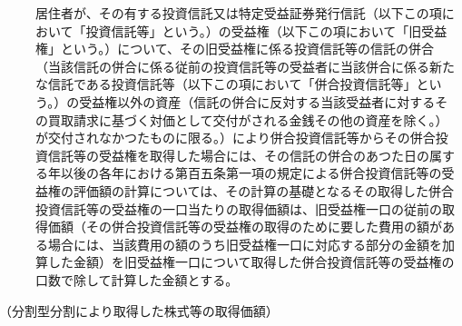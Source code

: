 \documentclass[twocolumn,a4j,10pt]{ltjtarticle}
\begin{document}
\begin{description}
\item[]居住者が、その有する投資信託又は特定受益証券発行信託（以下この項において「投資信託等」という。）の受益権（以下この項において「旧受益権」という。）について、その旧受益権に係る投資信託等の信託の併合（当該信託の併合に係る従前の投資信託等の受益者に当該併合に係る新たな信託である投資信託等（以下この項において「併合投資信託等」という。）の受益権以外の資産（信託の併合に反対する当該受益者に対するその買取請求に基づく対価として交付がされる金銭その他の資産を除く。）が交付されなかつたものに限る。）により併合投資信託等からその併合投資信託等の受益権を取得した場合には、その信託の併合のあつた日の属する年以後の各年における第百五条第一項の規定による併合投資信託等の受益権の評価額の計算については、その計算の基礎となるその取得した併合投資信託等の受益権の一口当たりの取得価額は、旧受益権一口の従前の取得価額（その併合投資信託等の受益権の取得のために要した費用の額がある場合には、当該費用の額のうち旧受益権一口に対応する部分の金額を加算した金額）を旧受益権一口について取得した併合投資信託等の受益権の口数で除して計算した金額とする。
\end{description}
\noindent\hspace{10pt}（分割型分割により取得した株式等の取得価額）
\end{document}
